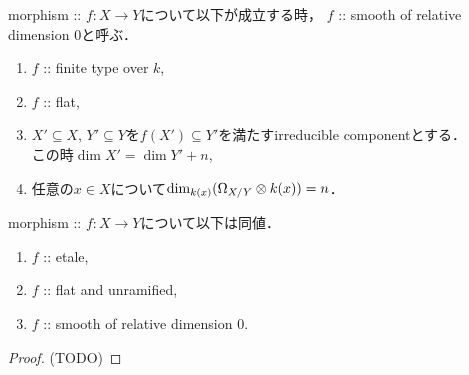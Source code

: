 \documentclass[a4paper]{jsarticle}
\begin{document}
\begin{Def}
    morphism :: $f \colon X \to Y$について以下が成立する時，
    $f$ :: smooth of relative dimension $0$と呼ぶ．
    \begin{enumerate}
        \item $f$ :: finite type over $k$,
        \item $f$ :: flat,
        \item
            $X' \subseteq X$, $Y' \subseteq Y$を$f(X') \subseteq Y'$を満たすirreducible componentとする． \mbox{} \\
            この時$\dim X'=\dim Y'+n$,
        \item 任意の$x \in X$について$\dim_{k(x)} (\Omega_{X/Y} \otimes k(x))=n$．
    \end{enumerate}
\end{Def}

\begin{Thm} \label{thm:etale_equiv}
    morphism :: $f \colon X \to Y$について以下は同値．
    \begin{enumerate}
        \item $f$ :: etale,
        \item $f$ :: flat and unramified, 
        \item $f$ :: smooth of relative dimension $0$.
    \end{enumerate}
\end{Thm}
\begin{proof}
    (TODO)
\end{proof}
\end{document}
